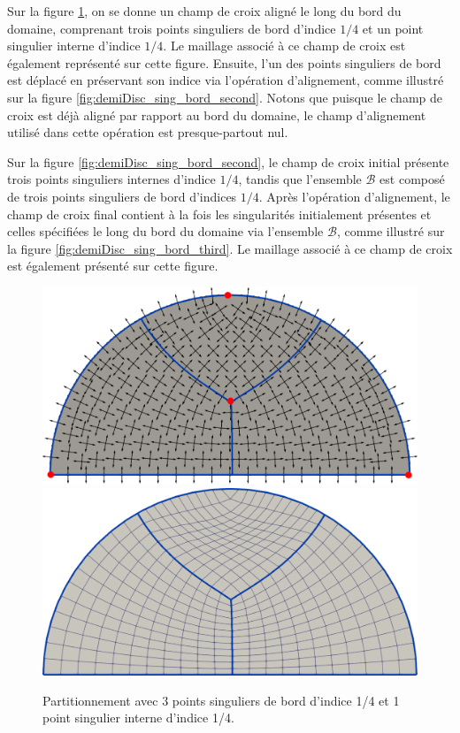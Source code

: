 Sur la figure \ref{fig:demiDisc_sing_bord_first}, on se donne un champ de croix aligné le long du bord du domaine, comprenant trois points singuliers de bord d'indice $1/4$ et un point singulier interne d'indice $1/4$. Le maillage associé à ce champ de croix est également représenté sur cette figure. Ensuite, l'un des points singuliers de bord est déplacé en préservant son indice via l'opération d'alignement, comme illustré sur la figure \ref{fig:demiDisc_sing_bord_second}. Notons que puisque le champ de croix est déjà aligné par rapport au bord du domaine, le champ d'alignement utilisé dans cette opération est presque-partout nul.

Sur la figure \ref{fig:demiDisc_sing_bord_second}, le champ de croix initial présente trois points singuliers internes d'indice $1/4$, tandis que l'ensemble $\mathcal{B}$ est composé de trois points singuliers de bord d'indices $1/4$. Après l'opération d'alignement, le champ de croix final contient à la fois les singularités initialement présentes et celles spécifiées le long du bord du domaine via l'ensemble $\mathcal{B}$, comme illustré sur la figure \ref{fig:demiDisc_sing_bord_third}. Le maillage associé à ce champ de croix est également présenté sur cette figure.


\begin{figure}[!h]
\centering
\includegraphics[scale=0.24]{images/yo_1.pdf}\\[0.5cm]
\includegraphics[scale=0.24]{images/yo_2.pdf}
\caption{Partitionnement avec 3 points singuliers de bord d'indice 1/4 et 1 point singulier interne d'indice 1/4.}
\label{fig:demiDisc_sing_bord_first}
\end{figure}

